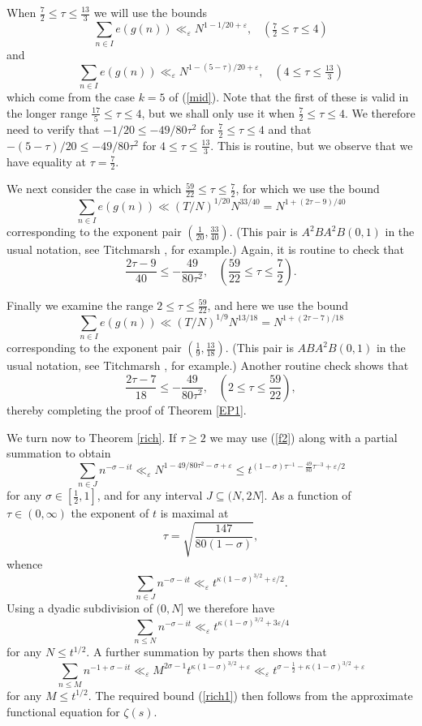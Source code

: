 \documentclass[a4paper,10pt]{article}
\newcommand{\ep}{\varepsilon}
\begin{document}
When $\tfrac72\le\tau\le\tfrac{13}{3}$ we will use the bounds
\[\sum_{n\in I}e(g(n))\ll_{\ep} N^{1-1/20+\ep},\;\;\;(\tfrac72\le\tau\le
4)\]
and
\[\sum_{n\in I}e(g(n))\ll_{\ep} N^{1-(5-\tau)/20+\ep},\;\;\;(4\le\tau\le
\tfrac{13}{3})\]
which come from the case $k=5$ of (\ref{mid}). Note that the first of
these is valid in the longer range $\tfrac{17}{5}\le\tau\le 4$, but we
shall only use it when $\tfrac72\le\tau\le 4$. We therefore need to
verify that $-1/20\le-49/80\tau^2$ for $\tfrac72\le\tau\le 4$ and that
$-(5-\tau)/20\le-49/80\tau^2$ for $4\le\tau\le \tfrac{13}{3}$. This
is routine, but we observe that we have equality at $\tau=\tfrac72$.

We next consider the case in which $\tfrac{59}{22}\le\tau\le\tfrac72$, 
for which we use the bound
\[\sum_{n\in I}e(g(n))\ll (T/N)^{1/20}N^{33/40}=N^{1+(2\tau-9)/40}\]
corresponding to the exponent pair
$(\tfrac{1}{20},\tfrac{33}{40})$. (This pair is $A^2BA^2B(0,1)$ in the
usual notation, see Titchmarsh \cite[\S 5.20]{Titch}, for example.)
Again, it is routine to check that
\[\frac{2\tau-9}{40}\le-\frac{49}{80\tau^2},\;\;\;(\frac{59}{22}\le
\tau\le\frac{7}{2}).\]

Finally we examine the range $2\le\tau\le\tfrac{59}{22}$, and here we
use the bound
\[\sum_{n\in I}e(g(n))\ll (T/N)^{1/9}N^{13/18}=N^{1+(2\tau-7)/18}\]
corresponding to the exponent pair
$(\tfrac{1}{9},\tfrac{13}{18})$. (This pair is $ABA^2B(0,1)$ in the
usual notation, see Titchmarsh \cite[\S 5.20]{Titch}, for example.)
Another routine check shows that
\[\frac{2\tau-7}{18}\le-\frac{49}{80\tau^2},\;\;\;(2\le
\tau\le\frac{59}{22}),\]
thereby completing the proof of Theorem \ref{EP1}.
\bigskip

We turn now to Theorem \ref{rich}. If $\tau\ge 2$ we may use 
(\ref{f2}) along with a
partial summation to obtain
\[\sum_{n\in J}n^{-\sigma-it}\ll_{\ep} N^{1-49/80\tau^2-\sigma+\ep}\le
t^{(1-\sigma)\tau^{-1}-\tfrac{49}{80}\tau^{-3}+\ep/2}\]
for any $\sigma\in[\tfrac12,1]$, and for any interval $J\subseteq(N,2N]$.
As a function of
$\tau\in(0,\infty)$ the exponent of $t$ is maximal at
\[\tau=\sqrt{\frac{147}{80(1-\sigma)}},\]
whence
\[\sum_{n\in J}n^{-\sigma-it}\ll_{\ep}t^{\kappa(1-\sigma)^{3/2}+\ep/2}.\]
Using a dyadic subdivision of $(0,N]$ we therefore have
\[\sum_{n\le N}n^{-\sigma-it}\ll_{\ep}t^{\kappa(1-\sigma)^{3/2}+3\ep/4}\]
for any $N\le t^{1/2}$. A further summation by parts then shows that
\[\sum_{n\le M}n^{-1+\sigma-it}
\ll_{\ep}M^{2\sigma-1}t^{\kappa(1-\sigma)^{3/2}+\ep}
\ll_{\ep}t^{\sigma-\tfrac12+\kappa(1-\sigma)^{3/2}+\ep}\]
for any $M\le t^{1/2}$. The required bound (\ref{rich1}) then follows
from the approximate functional equation for $\zeta(s)$.
\end{document}
